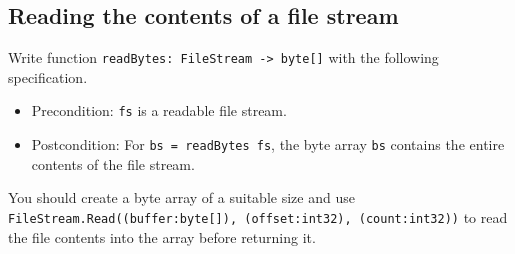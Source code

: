\subsection*{Reading the contents of a file stream}

Write function \texttt{readBytes: FileStream -> byte[]} with the following specification.  
\begin{itemize}
\item Precondition: \texttt{fs} is a readable file stream.
\item Postcondition: For \texttt{bs = readBytes fs}, the byte array \texttt{bs} contains the entire contents of the file stream.   
\end{itemize}

You should create a byte array of a suitable size and use \texttt{FileStream.Read((buffer:byte[]), (offset:int32), (count:int32))} to read the file contents into the array before returning it.
